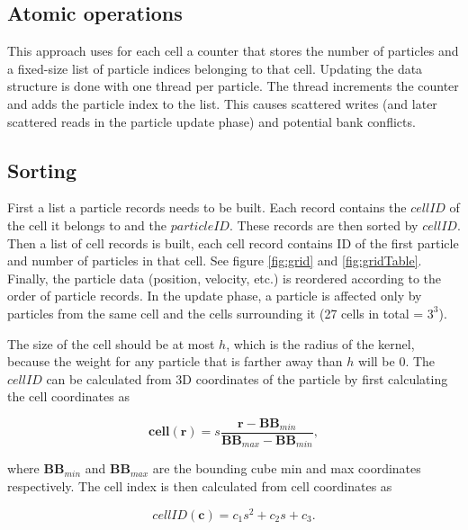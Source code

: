 \documentclass[a4paper,report]{IEEEtran}
\begin{document}
\subsection{Atomic operations}
This approach uses for each cell a counter that stores the number of particles and a fixed-size list of particle indices belonging to that cell. Updating the data structure is done with one thread per particle. The thread increments the counter and adds the particle index to the list. This causes scattered writes (and later scattered reads in the particle update phase) and potential bank conflicts.

\subsection{Sorting}
First a list a particle records needs to be built. Each record contains the $cellID$ of the cell it belongs to and the $particleID$. These records are then sorted by $cellID$. Then a list of cell records is built, each cell record contains ID of the first particle and number of particles in that cell. See figure \ref{fig:grid} and \ref{fig:gridTable}. Finally, the particle data (position, velocity, etc.) is reordered according to the order of particle records. In the update phase, a particle is affected only by particles from the same cell and the cells surrounding it (27 cells in total = $3^3$). 

The size of the cell should be at most $h$, which is the radius of the kernel, because the weight for any particle that is farther away than $h$ will be 0. The $cellID$ can be calculated from 3D coordinates of the particle by first calculating the cell coordinates as 

\begin{equation}
	\mathbf{cell}(\mathbf{r}) = s\frac{\mathbf{r}-\mathbf{BB}_{min}}{\mathbf{BB}_{max} - \mathbf{BB}_{min}},
\end{equation}

where $\mathbf{BB}_{min}$ and $\mathbf{BB}_{max}$ are the bounding cube min and max coordinates respectively. The cell index is then calculated from cell coordinates as

\begin{equation}
	cellID(\mathbf{c}) = c_1s^2 + c_2s + c_3.
\end{equation}
\end{document}
